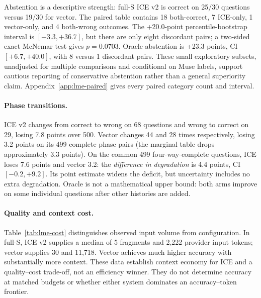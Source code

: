 \documentclass[11pt,a4paper]{article}
\begin{document}
Abstention is a descriptive strength: full-S ICE v2 is correct on 25/30 questions versus 19/30 for vector. The paired table contains 18 both-correct, 7 ICE-only, 1 vector-only, and 4 both-wrong outcomes. The +20.0-point percentile-bootstrap interval is $[+3.3,+36.7]$, but there are only eight discordant pairs; a two-sided exact McNemar test gives $p=0.0703$. Oracle abstention is +23.3 points, CI $[+6.7,+40.0]$, with 8 versus 1 discordant pairs. These small exploratory subsets, unadjusted for multiple comparisons and conditional on Muse labels, support cautious reporting of conservative abstention rather than a general superiority claim. Appendix~\ref{app:lme-paired} gives every paired category count and interval.

\paragraph{Phase transitions.}
ICE v2 changes from correct to wrong on 68 questions and wrong to correct on 29, losing 7.8 points over 500. Vector changes 44 and 28 times respectively, losing 3.2 points on its 499 complete phase pairs (the marginal table drops approximately 3.3 points). On the common 499 four-way-complete questions, ICE loses 7.6 points and vector 3.2: the \emph{difference in degradation} is 4.4 points, CI $[-0.2,+9.2]$. Its point estimate widens the deficit, but uncertainty includes no extra degradation. Oracle is not a mathematical upper bound: both arms improve on some individual questions after other histories are added.

\paragraph{Quality and context cost.}
Table~\ref{tab:lme-cost} distinguishes observed input volume from configuration. In full-S, ICE v2 supplies a median of 5 fragments and 2,222 provider input tokens; vector supplies 30 and 11,718. Vector achieves much higher accuracy with substantially more context. These data establish context economy for ICE and a quality--cost trade-off, not an efficiency winner. They do not determine accuracy at matched budgets or whether either system dominates an accuracy--token frontier.
\end{document}
